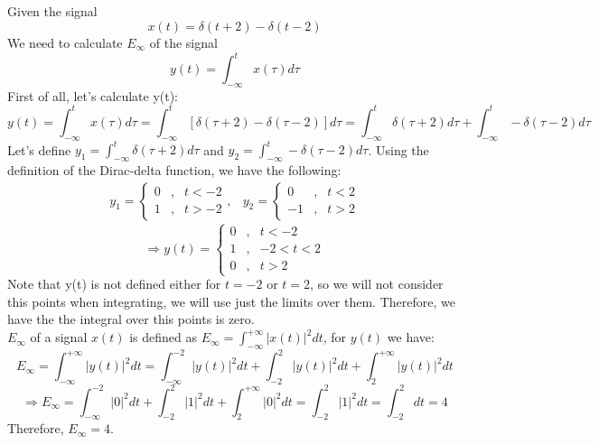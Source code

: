 \documentclass{article}
\begin{document}
\subsection{} Given the signal
\begin{equation*}
x(t) = \delta(t+2)-\delta(t-2)
\end{equation*}
We need to calculate $E_{\infty}$ of the signal
\begin{equation*}
y(t) = \int_{-\infty}^{t} x(\tau) d\tau
\end{equation*}
First of all, let's calculate y(t):
\begin{equation*}
y(t) = \int_{-\infty}^{t} x(\tau) d\tau = \int_{-\infty}^{t} [\delta(\tau+2)-\delta(\tau-2)] d\tau = \int_{-\infty}^{t} \delta(\tau+2)d\tau + \int_{-\infty}^{t}-\delta(\tau-2) d\tau
\end{equation*}
Let's define $y_{1} = \int_{-\infty}^{t} \delta(\tau+2)d\tau$ and $y_{2} = \int_{-\infty}^{t}-\delta(\tau-2) d\tau$. Using the definition of the Dirac-delta function, we have the following: \\
\begin{equation*}
\begin{array}{cc} y_{1} = \left\{ \begin{array}{lll} 0 &,& t < -2 \\ 1 &,& t > -2\end{array} \right., & y_{2} = \left\{ \begin{array}{lll} 0 &,& t < 2 \\ -1 &,& t > 2\end{array} \right. \end{array}
\end{equation*}
\begin{equation*}
\Rightarrow y(t) = \left\{ \begin{array}{lll} 0 &,& t < -2 \\ 1 &,& -2 < t < 2 \\ 0 &,& t > 2\end{array} \right.
\end{equation*}
Note that y(t) is not defined either for $t=-2$ or $t=2$, so we will not consider this points when integrating, we will use just the limits over them. Therefore, we have the the integral over this points is zero. \\
$E_{\infty}$ of a signal $x(t)$ is defined as $E_{\infty}=\int_{-\infty}^{+\infty} |x(t)|^{2} dt$, for $y(t)$ we have: \\
\begin{equation*}
E_{\infty} = \int_{-\infty}^{+\infty} |y(t)|^{2} dt = \int_{-\infty}^{-2} |y(t)|^{2} dt + \int_{-2}^{2} |y(t)|^{2} dt + \int_{2}^{+\infty} |y(t)|^{2} dt
\end{equation*}
\begin{equation*}
\Rightarrow E_{\infty} = \int_{-\infty}^{-2} |0|^{2} dt + \int_{-2}^{2} |1|^{2} dt + \int_{2}^{+\infty} |0|^{2} dt = \int_{-2}^{2} |1|^{2} dt = \int_{-2}^{2} dt = 4
\end{equation*}
Therefore, $E_{\infty}=4$.
\setcounter{subsection}{14}
\end{document}
